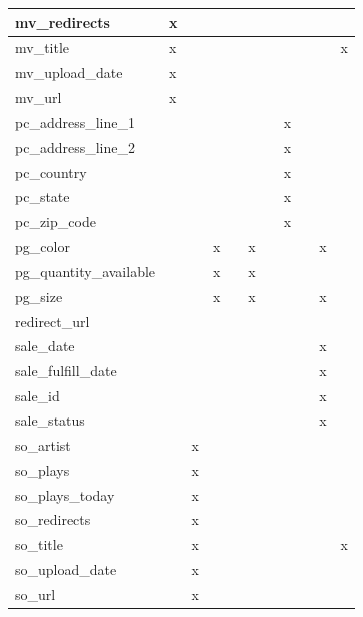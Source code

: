 \documentclass[11pt, a4paper]{report}
\begin{document}
\begin{longtable}{|l|l|l|l|l|l|l|l|l|l|l|}
mv\_redirects           & x &   &   &   &   &   &   &   &   &   \\ \hline
mv\_title               & x &   &   &   &   &   &   &   &   & x \\ \hline
mv\_upload\_date        & x &   &   &   &   &   &   &   &   &   \\ \hline
mv\_url                 & x &   &   &   &   &   &   &   &   &   \\ \hline
pc\_address\_line\_1    &   &   &   &   &   &   & x &   &   &   \\ \hline
pc\_address\_line\_2    &   &   &   &   &   &   & x &   &   &   \\ \hline
pc\_country             &   &   &   &   &   &   & x &   &   &   \\ \hline
pc\_state               &   &   &   &   &   &   & x &   &   &   \\ \hline
pc\_zip\_code           &   &   &   &   &   &   & x &   &   &   \\ \hline
pg\_color               &   &   & x &   & x &   &   &   & x &   \\ \hline
pg\_quantity\_available &   &   & x &   & x &   &   &   &   &   \\ \hline
pg\_size                &   &   & x &   & x &   &   &   & x &   \\ \hline
redirect\_url           &   &   &   &   &   &   &   &   &   &   \\ \hline
sale\_date              &   &   &   &   &   &   &   &   & x &   \\ \hline
sale\_fulfill\_date     &   &   &   &   &   &   &   &   & x &   \\ \hline
sale\_id                &   &   &   &   &   &   &   &   & x &   \\ \hline
sale\_status            &   &   &   &   &   &   &   &   & x &   \\ \hline
so\_artist              &   & x &   &   &   &   &   &   &   &   \\ \hline
so\_plays               &   & x &   &   &   &   &   &   &   &   \\ \hline
so\_plays\_today        &   & x &   &   &   &   &   &   &   &   \\ \hline
so\_redirects           &   & x &   &   &   &   &   &   &   &   \\ \hline
so\_title               &   & x &   &   &   &   &   &   &   & x \\ \hline
so\_upload\_date        &   & x &   &   &   &   &   &   &   &   \\ \hline
so\_url                 &   & x &   &   &   &   &   &   &   &   \\ \hline

\end{longtable}
\end{document}
